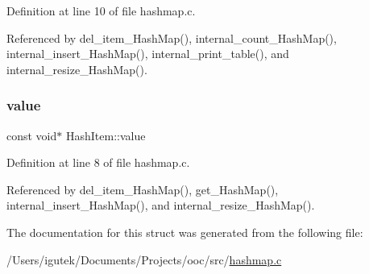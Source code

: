Definition at line 10 of file hashmap.\+c.



Referenced by del\+\_\+item\+\_\+\+Hash\+Map(), internal\+\_\+count\+\_\+\+Hash\+Map(), internal\+\_\+insert\+\_\+\+Hash\+Map(), internal\+\_\+print\+\_\+table(), and internal\+\_\+resize\+\_\+\+Hash\+Map().

\mbox{\label{structHashItem_abb041948b3408787c4d46d9afd8fb793}} 
\subsubsection{\texorpdfstring{value}{value}}
{\footnotesize\ttfamily const void$\ast$ Hash\+Item\+::value}



Definition at line 8 of file hashmap.\+c.



Referenced by del\+\_\+item\+\_\+\+Hash\+Map(), get\+\_\+\+Hash\+Map(), internal\+\_\+insert\+\_\+\+Hash\+Map(), and internal\+\_\+resize\+\_\+\+Hash\+Map().



The documentation for this struct was generated from the following file\+:\begin{DoxyCompactItemize}
\item 
/\+Users/igutek/\+Documents/\+Projects/ooc/src/\mbox{\hyperlink{hashmap_8c}{hashmap.\+c}}\end{DoxyCompactItemize}
